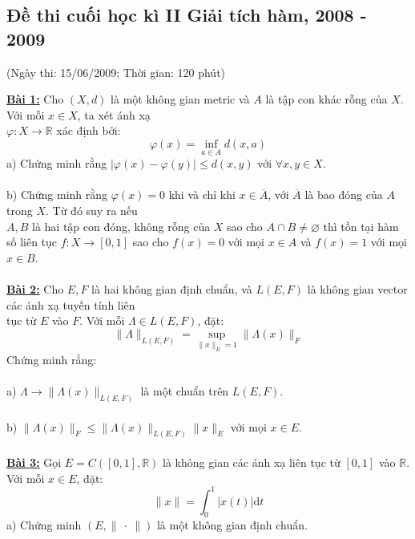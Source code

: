 \documentclass[10pt, a4paper]{article}
\begin{document}
\newpage

\subsection{Đề thi cuối học kì II Giải tích hàm, 2008 - 2009}
\begin{center}
	\color{blue}(Ngày thi: 15/06/2009; Thời gian: 120 phút)
\end{center}
\color{red}\underline{\textbf{Bài 1:}} \color{black}Cho $(X,d)$ là một không gian metric và $A$ là tập con khác rỗng của $X$. Với mỗi $x\in X$, ta xét ánh xạ\\ $\varphi:X\rightarrow\mathbb R$ xác định bởi: $$\varphi(x)=\displaystyle\inf_{a\in A}d(x,a)$$
\color{red}a) \color{black}Chứng minh rằng $|\varphi(x)-\varphi(y)|\le d(x,y)$ với $\forall x,y\in X$.\\\\
\color{red}b) \color{black}Chứng minh rằng $\varphi(x)=0$ khi và chỉ khi $x\in\overline A$, với $\overline A$ là bao đóng của $A$ trong $X$. Từ đó suy ra nếu\\ $A,B$ là hai tập con đóng, không rỗng của $X$ sao cho $A\cap B\ne\varnothing$ thì tồn tại hàm số liên tục $f:X\rightarrow[0,1]$ sao cho $f(x)=0$ với mọi $x\in A$ và $f(x)=1$ với mọi $x\in B$.\\\\
\color{red}\underline{\textbf{Bài 2:}} \color{black}Cho $E,F$ là hai không gian định chuẩn, và $L(E,F)$ là không gian vector các ánh xạ tuyến tính liên\\ tục từ $E$ vào $F$. Với mỗi $\Lambda\in L(E,F)$, đặt: $$\lVert\Lambda\rVert_{L(E,F)}=\displaystyle\sup_{\lVert x\rVert_E=1}\lVert\Lambda(x)\rVert_F$$ Chứng minh rằng:\\\\
\color{red}a) \color{black}$\Lambda\rightarrow\lVert\Lambda(x)\rVert_{L(E,F)}$ là một chuẩn trên $L(E,F)$.\\\\
\color{red}b) \color{black}$\lVert\Lambda(x)\rVert_F\le\lVert\Lambda(x)\rVert_{L(E,F)}\lVert x\rVert_E$ với mọi $x\in E$.\\\\
\color{red}\underline{\textbf{Bài 3:}} \color{black}Gọi $E=C([0,1],\mathbb R)$ là không gian các ánh xạ liên tục từ $[0,1]$ vào $\mathbb R$. Với mỗi $x\in E$, đặt: $$\lVert x\rVert=\displaystyle\int_0^1|x(t)|\text{d}t$$
\color{red}a) \color{black}Chứng minh $(E,\lVert~\cdot~\rVert)$ là một không gian định chuẩn.\\\\
\end{document}
